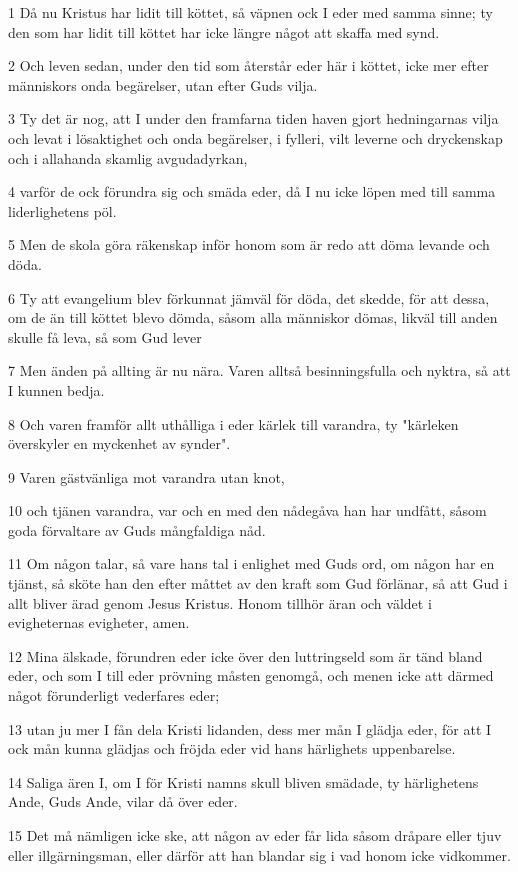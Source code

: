 \par 1 Då nu Kristus har lidit till köttet, så väpnen ock I eder med samma sinne; ty den som har lidit till köttet har icke längre något att skaffa med synd.
\par 2 Och leven sedan, under den tid som återstår eder här i köttet, icke mer efter människors onda begärelser, utan efter Guds vilja.
\par 3 Ty det är nog, att I under den framfarna tiden haven gjort hedningarnas vilja och levat i lösaktighet och onda begärelser, i fylleri, vilt leverne och dryckenskap och i allahanda skamlig avgudadyrkan,
\par 4 varför de ock förundra sig och smäda eder, då I nu icke löpen med till samma liderlighetens pöl.
\par 5 Men de skola göra räkenskap inför honom som är redo att döma levande och döda.
\par 6 Ty att evangelium blev förkunnat jämväl för döda, det skedde, för att dessa, om de än till köttet blevo dömda, såsom alla människor dömas, likväl till anden skulle få leva, så som Gud lever
\par 7 Men änden på allting är nu nära. Varen alltså besinningsfulla och nyktra, så att I kunnen bedja.
\par 8 Och varen framför allt uthålliga i eder kärlek till varandra, ty "kärleken överskyler en myckenhet av synder".
\par 9 Varen gästvänliga mot varandra utan knot,
\par 10 och tjänen varandra, var och en med den nådegåva han har undfått, såsom goda förvaltare av Guds mångfaldiga nåd.
\par 11 Om någon talar, så vare hans tal i enlighet med Guds ord, om någon har en tjänst, så sköte han den efter måttet av den kraft som Gud förlänar, så att Gud i allt bliver ärad genom Jesus Kristus. Honom tillhör äran och väldet i evigheternas evigheter, amen.
\par 12 Mina älskade, förundren eder icke över den luttringseld som är tänd bland eder, och som I till eder prövning måsten genomgå, och menen icke att därmed något förunderligt vederfares eder;
\par 13 utan ju mer I fån dela Kristi lidanden, dess mer mån I glädja eder, för att I ock mån kunna glädjas och fröjda eder vid hans härlighets uppenbarelse.
\par 14 Saliga ären I, om I för Kristi namns skull bliven smädade, ty härlighetens Ande, Guds Ande, vilar då över eder.
\par 15 Det må nämligen icke ske, att någon av eder får lida såsom dråpare eller tjuv eller illgärningsman, eller därför att han blandar sig i vad honom icke vidkommer.
